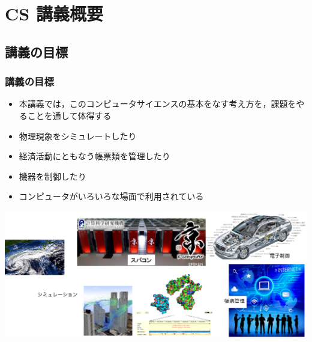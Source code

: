 \section{CS 講義概要}
%
%
\subsection{講義の目標}
\begin{frame}
\frametitle{講義の目標}
  \begin{itemize}
\item 本講義では，このコンピュータサイエンスの基本をなす考え方を，課題をやることを通して体得する
\item 物理現象をシミュレートしたり
\item 経済活動にともなう帳票類を管理したり
\item 機器を制御したり
\item コンピュータがいろいろな場面で利用されている
  \end{itemize}
\centering
\includegraphics[scale=.35]{./Figure/elementaryCS-1st-FigComputer.eps}
\end{frame}
